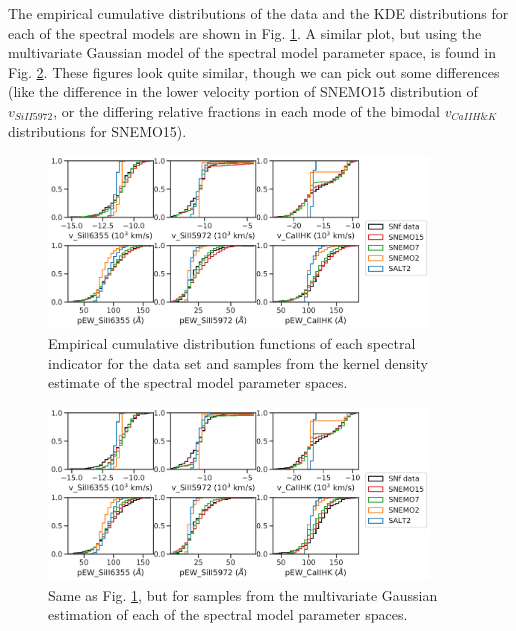 The empirical cumulative distributions of the data and the KDE distributions for each of the spectral models are shown in Fig. \ref{fig:ecdf_kde}. A similar plot, but using the multivariate Gaussian model of the spectral model parameter space, is found in Fig. \ref{fig:ecdf_gauss}. These figures look quite similar, though we can pick out some differences (like the difference in the lower velocity portion of SNEMO15 distribution of $v_{SiII5972}$, or the differing relative fractions in each mode of the bimodal $v_{CaIIH\&K}$ distributions for SNEMO15).

\begin{figure}
    \centering
    \includegraphics[width=0.9\textwidth]{figures/snemo_kde/ecdf_kde.pdf}
    \caption{Empirical cumulative distribution functions of each spectral indicator for the data set and samples from the kernel density estimate of the spectral model parameter spaces.}
    \label{fig:ecdf_kde}
\end{figure}

\begin{figure}
    \centering
    \includegraphics[width=0.9\textwidth]{figures/snemo_kde/ecdf_gauss.pdf}
    \caption{Same as Fig. \ref{fig:ecdf_kde}, but for samples from the multivariate Gaussian estimation of each of the spectral model parameter spaces.}
    \label{fig:ecdf_gauss}
\end{figure}


